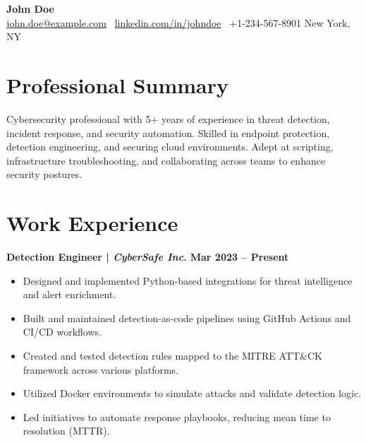 \documentclass[a4paper,10pt]{article}
\begin{document}
\begin{center}
    {\LARGE \bfseries John Doe} \\
    \vspace{2mm}
    \href{mailto:john.doe@example.com}{john.doe@example.com} \quad
    \faLinkedin \ \href{https://www.linkedin.com/in/johndoe}{linkedin.com/in/johndoe} \quad
    \faPhone \ +1-234-567-8901 \quad
    New York, NY
\end{center}

\vspace{3mm}

\section{Professional Summary}

Cybersecurity professional with 5+ years of experience in threat detection, incident response, and security automation. Skilled in endpoint protection, detection engineering, and securing cloud environments. Adept at scripting, infrastructure troubleshooting, and collaborating across teams to enhance security postures.

\vspace{2mm}

\section{Work Experience}

\textbf{Detection Engineer | \textit{CyberSafe Inc.}} \hfill \textbf{Mar 2023 – Present}
\begin{itemize}
    \item Designed and implemented Python-based integrations for threat intelligence and alert enrichment.
    \item Built and maintained detection-as-code pipelines using GitHub Actions and CI/CD workflows.
    \item Created and tested detection rules mapped to the MITRE ATT\&CK framework across various platforms.
    \item Utilized Docker environments to simulate attacks and validate detection logic.
    \item Led initiatives to automate response playbooks, reducing mean time to resolution (MTTR).
\end{itemize}

\vspace{2mm}
\end{document}
